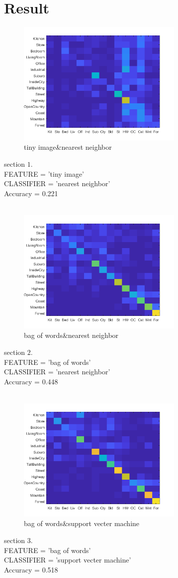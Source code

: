 \section*{Result}
\begin{figure}[!h]
    \centering
    \includegraphics[width=8cm]{image1.png}
    \caption{tiny image\&nearest neighbor}
    \label{fig:result1}
\end{figure}
section $1.$ \\
FEATURE = 'tiny image'\\
CLASSIFIER = 'nearest neighbor'\\
Accuracy = 0.221\\
\\
\begin{figure}[!h]
    \centering
    \includegraphics[width=8cm]{image2.png}
    \caption{bag of words\&nearest neighbor}
    \label{fig:result2}
\end{figure}
section $2.$ \\
FEATURE = 'bag of words'\\
CLASSIFIER = 'nearest neighbor'\\
Accuracy = 0.448\\
\\
\newpage
\begin{figure}[!h]
    \centering
    \includegraphics[width=8cm]{image3.png}
    \caption{bag of words\&support vecter machine}
    \label{fig:result3}
\end{figure}
section $3.$ \\
FEATURE = 'bag of words'\\
CLASSIFIER = 'support vecter machine'\\
Accuracy = 0.518\\
\\
